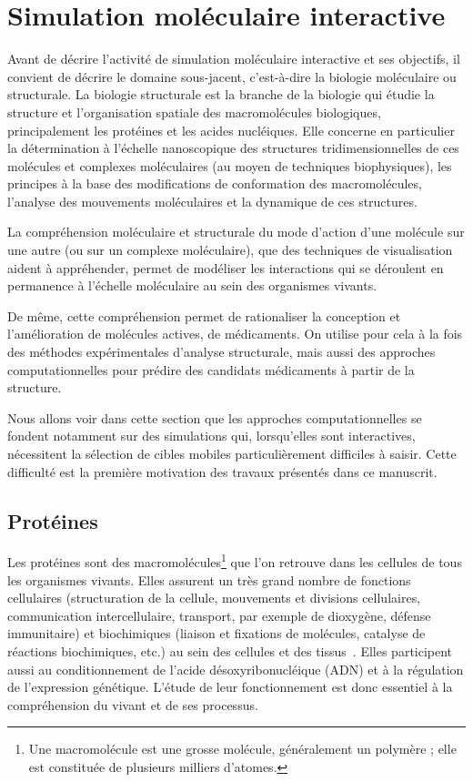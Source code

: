 	\section{Simulation moléculaire interactive}
	Avant de décrire l'activité de simulation moléculaire interactive et ses objectifs, il convient de décrire le domaine sous-jacent, c'est-à-dire la biologie moléculaire ou structurale. 
	La biologie structurale est la branche de la biologie qui étudie la structure et l'organisation spatiale des macromolécules biologiques, principalement les protéines et les acides nucléiques. Elle concerne en particulier la détermination à l'échelle nanoscopique des structures tridimensionnelles de ces molécules et complexes moléculaires (au moyen de techniques biophysiques), les principes à la base des modifications de conformation des macromolécules, l'analyse des mouvements moléculaires et la dynamique de ces structures.

La compréhension moléculaire et structurale du mode d'action d'une molécule sur une autre (ou sur un complexe moléculaire), que des techniques de visualisation aident à appréhender, permet de modéliser les interactions qui se déroulent en permanence à l'échelle moléculaire au sein des organismes vivants.

De même, cette compréhension permet de rationaliser la conception et l'amélioration de molécules actives, de médicaments. On utilise pour cela à la fois des méthodes expérimentales d'analyse structurale, mais aussi des approches computationnelles pour prédire des candidats médicaments à partir de la structure.

Nous allons voir dans cette section que les approches computationnelles se fondent notamment sur des simulations qui, lorsqu'elles sont interactives, nécessitent la sélection de cibles mobiles particulièrement difficiles à saisir. Cette difficulté est la première motivation des travaux présentés dans ce manuscrit.
	
	\subsection{Protéines}
	Les protéines sont des macromolécules\footnote{Une macromolécule est une \og grosse \fg{} molécule, généralement un polymère ; elle est constituée de plusieurs milliers d'atomes.} que l'on retrouve dans les cellules de tous les organismes vivants. Elles assurent un très grand nombre de fonctions cellulaires (structuration de la cellule, mouvements et divisions cellulaires, communication intercellulaire, transport, par exemple de dioxygène, défense immunitaire) et biochimiques (liaison et fixations de molécules, catalyse de réactions biochimiques, etc.) au sein des cellules et des tissus~\cite{lodish2004molecular}. Elles participent aussi au conditionnement de l'acide désoxyribonucléique (ADN) et à la régulation de l'expression génétique. L'étude de leur fonctionnement est donc essentiel à la compréhension du vivant et de ses processus.
	
